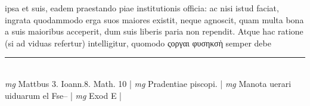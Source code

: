 \documentclass{article}
\begin{document}
\begin{pages}
ipsa et suis, eadem praestando piae institutionis officia: ac nisi istud faciat, ingrata quodammodo erga suos maiores existit, neque agnoscit, quam multa bona a suis maioribus acceperit, dum suis liberis paria non rependit. Atque hac ratione (si ad viduas refertur) intelligitur, quomodo ςοργαι φυσηκσὴ semper debe\pend
\vspace{0.5cm}\noindent
\vspace{0.2cm}\rule{1cm}{0.2pt}\\ 
\hspace{0.2cm}\textit{mg}
\footnotesize Mattbus 3. Ioann.8. Math. 10 
\normalsize| 
\hspace{0.2cm}\textit{mg}
\footnotesize Pradentiae piscopi. 
\normalsize| 
\hspace{0.2cm}\textit{mg}
\footnotesize Manota uerari uiduarum el Fse-- 
\normalsize| 
\hspace{0.2cm}\textit{mg}
\footnotesize Exod E 
\normalsize| 

\end{pages}
\end{document}
